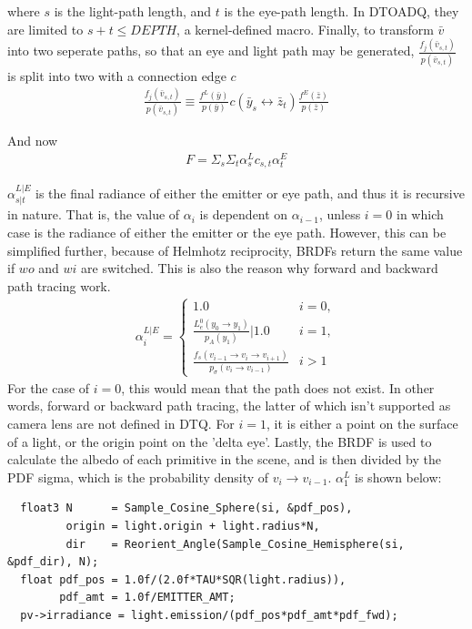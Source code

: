 \documentclass{article}
\begin{document}
    where $s$ is the light-path length, and $t$ is the eye-path length. In
    DTOADQ, they are limited to $s+t \leq DEPTH$, a kernel-defined macro.
Finally, to transform $\bar{v}$ into two seperate paths, so that an eye and
light path may be generated, $\frac{f_j(\bar{v}_{s, t})}{p(\bar{v}_{s, t})}$ is
split into two with a connection edge $c$
  \begin{align}
    \frac{f_j(\bar{v}_{s, t})}{p(\bar{v}_{s, t})} \equiv
    \frac{f^L(\bar{y})}{p(\bar{y})} c(\bar{y}_s \leftrightarrow \bar{z}_t)
    \frac{f^E(\bar{z})}{p(\bar{z})}  
  \end{align}

    And now
  \begin{align}
    F = \Sigma_s\Sigma_t \alpha^L_s c_{s, t} \alpha^E_t
  \end{align}

  $\alpha_{s|t}^{L|E}$ is the final radiance of either the emitter or eye path,
  and thus it is recursive in nature. That is, the value of $\alpha_i$ is
  dependent on $\alpha_{i-1}$, unless $i = 0$ in which case is the radiance of
  either the emitter or the eye path. However, this can be simplified further,
because of Helmhotz reciprocity, BRDFs return the same value if $wo$ and $wi$
are switched. This is also the reason why forward and backward path tracing
work.
  \begin{align}
    \alpha^{L|E}_i =
    \begin{cases}
      1.0 &i = 0,\\
      \frac{
      L_e^0(y_0 \rightarrow y_1)}{p_A(y_1)} | 1.0 &i = 1,\\
      \frac{f_s(v_{i-1} \rightarrow v_i \rightarrow v_{i+1})}{p_{\sigma}(v_i
      \rightarrow v_{i-1})} &i > 1
    \end{cases}
  \end{align}
    For the case of $i = 0$, this would mean that the path does not exist. In
other words, forward or backward path tracing, the latter of which isn't
supported as camera lens are not defined in DTQ. For $i = 1$, it is either a
point on the surface of a light, or the origin point on the 'delta eye'. Lastly,
the BRDF is used to calculate the albedo of each primitive in the scene, and is
then divided by the PDF sigma, which is the probability density of $v_i
\rightarrow v_{i-1}$. $\alpha_1^L$ is shown below:

\begin{lstlisting}
  float3 N      = Sample_Cosine_Sphere(si, &pdf_pos),
         origin = light.origin + light.radius*N,
         dir    = Reorient_Angle(Sample_Cosine_Hemisphere(si, &pdf_dir), N);
  float pdf_pos = 1.0f/(2.0f*TAU*SQR(light.radius)),
        pdf_amt = 1.0f/EMITTER_AMT;
  pv->irradiance = light.emission/(pdf_pos*pdf_amt*pdf_fwd);
\end{lstlisting}
\end{document}
